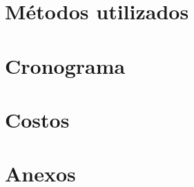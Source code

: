 \documentclass[letter,12pt]{book}
\begin{document}
  \chapter{Métodos utilizados}
  
  
  \chapter{Cronograma}
  
  
  \chapter{Costos}
  \label{cap:costos}
  
  
  
  
  
  
  
  \chapter{Anexos}
  
  
  
  
  
  
%   
  
  
  
\end{document}
